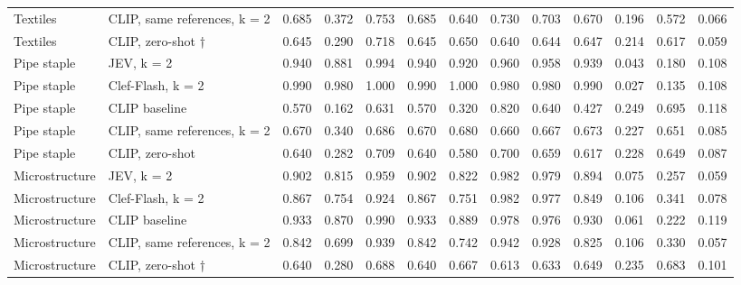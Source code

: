\begin{table}
\begin{tabular}[t]{llrrrrrrrrrrr}
Textiles & CLIP, same references, k = 2 & 0.685 & 0.372 & 0.753 & 0.685 & 0.640 & 0.730 & 0.703 & 0.670 & 0.196 & 0.572 & 0.066\\
Textiles & CLIP, zero-shot † & 0.645 & 0.290 & 0.718 & 0.645 & 0.650 & 0.640 & 0.644 & 0.647 & 0.214 & 0.617 & 0.059\\
\addlinespace
Pipe staple & JEV, k = 2 & 0.940 & 0.881 & 0.994 & 0.940 & 0.920 & 0.960 & 0.958 & 0.939 & 0.043 & 0.180 & 0.108\\
Pipe staple & Clef-Flash, k = 2 & 0.990 & 0.980 & 1.000 & 0.990 & 1.000 & 0.980 & 0.980 & 0.990 & 0.027 & 0.135 & 0.108\\
Pipe staple & CLIP baseline & 0.570 & 0.162 & 0.631 & 0.570 & 0.320 & 0.820 & 0.640 & 0.427 & 0.249 & 0.695 & 0.118\\
Pipe staple & CLIP, same references, k = 2 & 0.670 & 0.340 & 0.686 & 0.670 & 0.680 & 0.660 & 0.667 & 0.673 & 0.227 & 0.651 & 0.085\\
Pipe staple & CLIP, zero-shot & 0.640 & 0.282 & 0.709 & 0.640 & 0.580 & 0.700 & 0.659 & 0.617 & 0.228 & 0.649 & 0.087\\
\addlinespace
Microstructure & JEV, k = 2 & 0.902 & 0.815 & 0.959 & 0.902 & 0.822 & 0.982 & 0.979 & 0.894 & 0.075 & 0.257 & 0.059\\
Microstructure & Clef-Flash, k = 2 & 0.867 & 0.754 & 0.924 & 0.867 & 0.751 & 0.982 & 0.977 & 0.849 & 0.106 & 0.341 & 0.078\\
Microstructure & CLIP baseline & 0.933 & 0.870 & 0.990 & 0.933 & 0.889 & 0.978 & 0.976 & 0.930 & 0.061 & 0.222 & 0.119\\
Microstructure & CLIP, same references, k = 2 & 0.842 & 0.699 & 0.939 & 0.842 & 0.742 & 0.942 & 0.928 & 0.825 & 0.106 & 0.330 & 0.057\\
Microstructure & CLIP, zero-shot † & 0.640 & 0.280 & 0.688 & 0.640 & 0.667 & 0.613 & 0.633 & 0.649 & 0.235 & 0.683 & 0.101\\
\bottomrule
\end{tabular}
\end{table}
